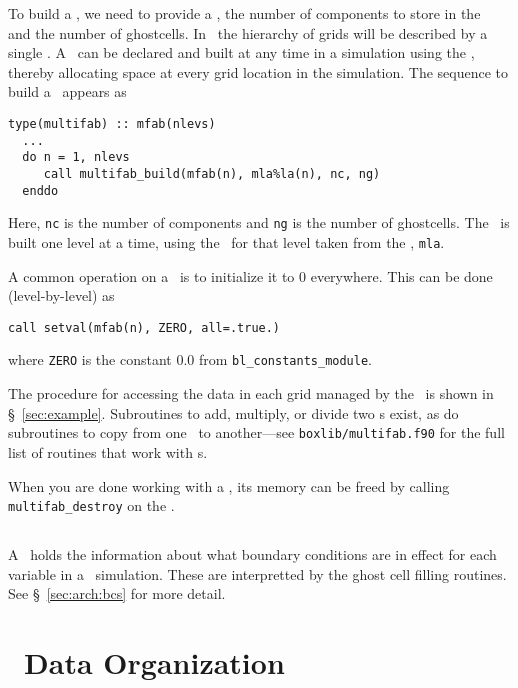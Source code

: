 To build a \multifab, we need to provide a \layout, the number of
components to store in the \multifab\, and the number of ghostcells.  In
\maestro\, the hierarchy of grids will be described by a single
\mllayout.  A \multifab\ can be declared and built at any time in a
simulation using the \mllayout, thereby allocating space at every
grid location in the simulation.  The sequence to build a \multifab\
appears as
\begin{lstlisting}[language={[95]fortran},mathescape=false]
  type(multifab) :: mfab(nlevs)
  ...
  do n = 1, nlevs
     call multifab_build(mfab(n), mla%la(n), nc, ng)
  enddo
\end{lstlisting}
Here, {\tt nc} is the number of components and {\tt ng} is the number
of ghostcells.  The \multifab\ is built one level at a time, using the
\layout\ for that level taken from the \mllayout, {\tt mla}.

A common operation on a \multifab\ is to initialize it to $0$
everywhere.  This can be done (level-by-level) as
\begin{lstlisting}[language={[95]fortran},mathescape=false]
call setval(mfab(n), ZERO, all=.true.)
\end{lstlisting}
where {\tt ZERO} is the constant 0.0 from {\tt bl\_constants\_module}.

The procedure for accessing the data in each grid managed by the \multifab\
is shown in \S~\ref{sec:example}.  
Subroutines to add, multiply, or divide two \multifab s exist, as do
subroutines to copy from one \multifab\ to another---see {\tt boxlib/multifab.f90}
for the full list of routines that work with \multifab s.


When you are done working with a \multifab, its memory can be freed by
calling {\tt multifab\_destroy} on the \multifab.




\subsection{\bctower}

A \bctower\ holds the information about what boundary conditions are
in effect for each variable in a
\maestro\ simulation.  These are interpretted by the ghost cell filling 
routines.  See \S~\ref{sec:arch:bcs} for more detail.

\section{\maestro\ Data Organization}

